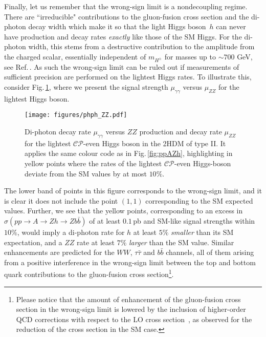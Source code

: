 \documentclass[12pt]{article}
\newcommand{\citere}[1]{Ref.\,\cite{#1}}
\newcommand{\abbrev}{\scalefont{.9}}
\newcommand{\fig}[1]{Fig.\,\ref{#1}}
\newcommand{\qcd}{{\abbrev QCD}}
\newcommand{\sm}{{\abbrev SM}}
\newcommand{\thdm}{{\abbrev 2HDM}}
\newcommand{\cp}{{\abbrev $\mathcal{CP}$}}
\newcommand{\lo}{{\abbrev LO}}
\begin{document}
Finally, let us remember that the wrong-sign limit is a nondecoupling regime. There are ``irreducible"
contributions to the gluon-fusion cross section and the di-photon decay width which make it
so that the light Higgs boson~$h$ can never have production and decay rates {\em exactly} like those of the \sm{} Higgs.
For the di-photon width, this stems from a destructive contribution to the amplitude from the charged scalar,
essentially independent of $m_{H^\pm}$ for masses up to $\sim 700$ GeV, see \citere{Ferreira:2014naa}.
As such the wrong-sign limit can be ruled out if measurements of sufficient precision are performed on the lightest
Higgs rates. To illustrate this, consider \fig{fig:ggZZ}, where we present the signal strength $\mu_{\gamma\gamma}$
versus $\mu_{ZZ}$ for the lightest Higgs boson.
%
\begin{figure}
\begin{center}
\texttt{[image: figures/phph\_ZZ.pdf]}
\end{center}
\caption{Di-photon decay rate $\mu_{\gamma\gamma}$ versus
$ZZ$ production and decay rate $\mu_{ZZ}$ for the lightest \cp{}-even Higgs boson in the \thdm{} of type II.
It applies the same colour code as in \fig{fig:ppAZh}, highlighting in yellow
points where the rates of the lightest \cp{}-even Higgs-boson deviate from the \sm{} values by at most $10\%$.
}
\label{fig:ggZZ}
\end{figure}

The lower band of points in this figure corresponds to the wrong-sign limit, and it is clear it does not include
the point $(1,1)$ corresponding to the \sm{} expected values. Further, we see that the yellow points,
corresponding to an excess in $\sigma(pp\to A \to Zh \to Zb\bar{b})$ of at least $0.1$\,pb and \sm{}-like signal strengths within $10\%$, would
imply a di-photon rate for $h$ at least $5\%$ {\em smaller} than its \sm{} expectation, and a $ZZ$ rate at
least $7\%$ {\em larger} than the \sm{} value. Similar enhancements are predicted for the $WW$, $\tau\bar\tau$ and
$b\bar{b}$ channels, all of them arising from a positive interference in the wrong-sign limit between the top and bottom quark
contributions to the gluon-fusion cross section\footnote{Please notice that the amount of
enhancement of the gluon-fusion cross section in the wrong-sign limit is lowered by the inclusion
of higher-order \qcd{} corrections with respect to the \lo{} cross section~\cite{Ferreira:2014naa},
as observed for the reduction of the cross section in the \sm{} case.\label{foot:f}}.
\end{document}

